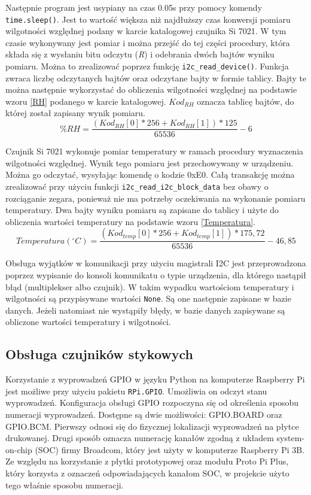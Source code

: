 \documentclass[a4paper,12pt,twoside]{article}
\begin{document}
Następnie program jest usypiany na czas 0.05s przy pomocy komendy \texttt{time.sleep()}. Jest to wartość większa niż najdłuższy czas konwersji pomiaru wilgotności względnej podany w karcie katalogowej czujnika Si 7021.\cite{czujnik_temp} W tym czasie wykonywany jest pomiar i można przejść do tej części procedury, która składa się z wysłaniu bitu odczytu (\textit{R}) i odebrania dwóch bajtów wyniku pomiaru. Można to zrealizować poprzez funkcję \texttt{i2c{\_}read{\_}device()}\cite{i2c_read_device}. Funkcja zwraca liczbę odczytanych bajtów oraz odczytane bajty w formie tablicy. Bajty te można następnie wykorzystać do obliczenia wilgotności względnej na podstawie wzoru \ref{RH} podanego w karcie katalogowej.\cite{czujnik_temp} ${Kod_{RH}}$ oznacza tablicę bajtów, do której został zapisany wynik pomiaru.
\begin{equation} \label{RH}
\%RH = \frac{(Kod_{RH}[0] * 256 + Kod_{RH}[1]) * 125}{65536} - 6  
\end{equation}

Czujnik Si 7021 wykonuje pomiar temperatury w ramach procedury wyznaczenia wilgotności względnej. Wynik tego pomiaru jest przechowywany w urządzeniu. Można go odczytać, wysyłając komendę o kodzie 0xE0. Całą transakcję można zrealizować przy użyciu funkcji \texttt{i2c{\_}read{\_}i2c{\_}block{\_}data} bez obawy o rozciąganie zegara, ponieważ nie ma potrzeby oczekiwania na wykonanie pomiaru temperatury. Dwa bajty wyniku pomiaru są zapisane do tablicy i użyte do obliczenia wartości temperatury na podstawie wzoru \ref{Temperatura}.\cite{czujnik_temp}
\begin{equation} \label{Temperatura}
Temperatura ({^\circ}C) = \frac{(Kod_{temp}[0] * 256 + Kod_{temp}[1]) * 175,72}{65536} - 46,85  
\end{equation}

Obsługa wyjątków w komunikacji przy użyciu magistrali I2C jest przeprowadzona poprzez wypisanie do konsoli komunikatu o typie urządzenia, dla którego nastąpił błąd (multiplekser albo czujnik). W takim wypadku wartościom temperatury i wilgotności są przypisywane wartości \texttt{None}. Są one następnie zapisane w bazie danych. Jeżeli natomiast nie wystąpiły błędy, w bazie danych zapisywane są obliczone wartości temperatury i wilgotności.

\subsection{Obsługa czujników stykowych}
Korzystanie z wyprowadzeń GPIO w języku Python na komputerze Raspberry Pi jest możliwe przy użyciu pakietu \texttt{RPi.GPIO}. Umożliwia on odczyt stanu wyprowadzeń. Konfiguracja obsługi GPIO rozpoczyna się od określenia sposobu numeracji wyprowadzeń. Dostępne są dwie możliwości: GPIO.BOARD oraz GPIO.BCM. Pierwszy odnosi się do fizycznej lokalizacji wyprowadzeń na płytce drukowanej. Drugi sposób oznacza numerację kanałów zgodną z układem system-on-chip (SOC) firmy Broadcom, który jest użyty w komputerze Raspberry Pi 3B. Ze względu na korzystanie z płytki prototypowej oraz modułu Proto Pi Plus, który korzysta z oznaczeń odpowiadających kanałom SOC, w projekcie użyto tego właśnie sposobu numeracji.
\end{document}
